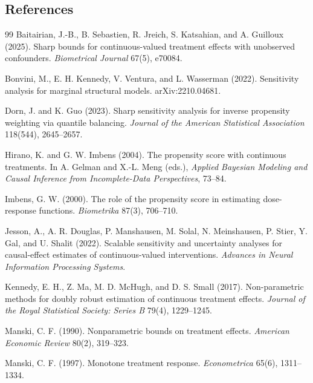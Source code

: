 \documentclass[11pt]{article}
\theoremstyle{definition}
\theoremstyle{plain}
\theoremstyle{remark}
\begin{document}
\subsection*{References}
\begin{thebibliography}{99}
Baitairian, J.-B., B. Sebastien, R. Jreich, S. Katsahian, and A. Guilloux (2025).
\newblock Sharp bounds for continuous-valued treatment effects with unobserved confounders.
\newblock \emph{Biometrical Journal} 67(5), e70084.

Bonvini, M., E. H. Kennedy, V. Ventura, and L. Wasserman (2022).
\newblock Sensitivity analysis for marginal structural models.
\newblock arXiv:2210.04681.

Dorn, J. and K. Guo (2023).
\newblock Sharp sensitivity analysis for inverse propensity weighting via quantile balancing.
\newblock \emph{Journal of the American Statistical Association} 118(544), 2645--2657.

Hirano, K. and G. W. Imbens (2004).
\newblock The propensity score with continuous treatments.
\newblock In A. Gelman and X.-L. Meng (eds.), \emph{Applied Bayesian Modeling and Causal Inference from Incomplete-Data Perspectives}, 73--84.

Imbens, G. W. (2000).
\newblock The role of the propensity score in estimating dose-response functions.
\newblock \emph{Biometrika} 87(3), 706--710.

Jesson, A., A. R. Douglas, P. Manshausen, M. Solal, N. Meinshausen, P. Stier, Y. Gal, and U. Shalit (2022).
\newblock Scalable sensitivity and uncertainty analyses for causal-effect estimates of continuous-valued interventions.
\newblock \emph{Advances in Neural Information Processing Systems}.

Kennedy, E. H., Z. Ma, M. D. McHugh, and D. S. Small (2017).
\newblock Non-parametric methods for doubly robust estimation of continuous treatment effects.
\newblock \emph{Journal of the Royal Statistical Society: Series B} 79(4), 1229--1245.

Manski, C. F. (1990).
\newblock Nonparametric bounds on treatment effects.
\newblock \emph{American Economic Review} 80(2), 319--323.

Manski, C. F. (1997).
\newblock Monotone treatment response.
\newblock \emph{Econometrica} 65(6), 1311--1334.


\end{thebibliography}
\end{document}
